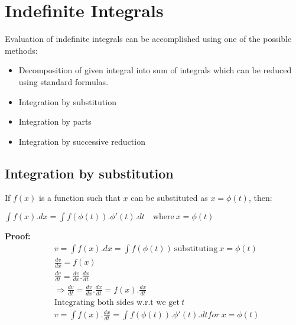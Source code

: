 \section{Indefinite Integrals}

Evaluation of indefinite integrals can be accomplished using one of the possible methods: \\[2mm]

\begin{itemize}
\item Decomposition of given integral into sum of integrals which can be reduced using standard formulas.

\item Integration by substitution

\item Integration by parts

\item Integration by successive reduction

\end{itemize}

\subsection{Integration by substitution}
If $f(x)$ is a function such that $x$ can be substituted as $ x = \phi(t) $, then: \\[2mm]

\begin{tcolorbox}
\begin{center}
$ \displaystyle \int f(x).dx = \int f(\phi(t)).\phi'(t).dt \quad \text{where} \: x = \phi(t) $
\end{center}
\end{tcolorbox}

\vspace{2mm}

\textbf{Proof:}
\noindent
\begin{align*}
&v = \int f(x).dx = \int f(\phi(t)) \: \text{substituting} \: x = \phi(t) \\
&\frac{dv}{dx} = f(x) \\
&\frac{dv}{dt} = \frac{dv}{dx}.\frac{dx}{dt} \\
&\Rightarrow \frac{dv}{dt} = \frac{dv}{dx}.\frac{dx}{dt} = f(x).\frac{dx}{dt} \\
&\text{Integrating both sides w.r.t we get} \: t \\
&v = \int f(x).\frac{dx}{dt} = \int f(\phi(t)).\phi'(t).dt for  \: x = \phi(t) \\
\end{align*}

